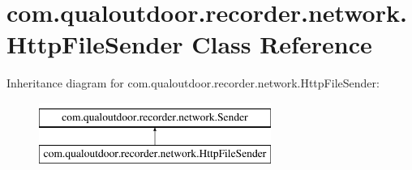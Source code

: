 \hypertarget{classcom_1_1qualoutdoor_1_1recorder_1_1network_1_1HttpFileSender}{\section{com.\-qualoutdoor.\-recorder.\-network.\-Http\-File\-Sender Class Reference}
\label{classcom_1_1qualoutdoor_1_1recorder_1_1network_1_1HttpFileSender}
}
Inheritance diagram for com.\-qualoutdoor.\-recorder.\-network.\-Http\-File\-Sender\-:\begin{figure}[H]
\begin{center}
\leavevmode
\includegraphics[height=2.000000cm]{classcom_1_1qualoutdoor_1_1recorder_1_1network_1_1HttpFileSender}
\end{center}
\end{figure}
